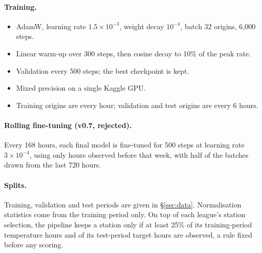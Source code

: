 \paragraph{Training.}
\begin{itemize}
\item AdamW, learning rate $1.5\times10^{-3}$, weight decay $10^{-4}$, batch 32 origins, 6{,}000 steps.
\item Linear warm-up over 300 steps, then cosine decay to 10\% of the peak rate.
\item Validation every 500 steps; the best checkpoint is kept.
\item Mixed precision on a single Kaggle GPU.
\item Training origins are every hour; validation and test origins are every 6 hours.
\end{itemize}

\paragraph{Rolling fine-tuning (v0.7, rejected).}
Every 168 hours, each final model is fine-tuned for 500 steps at learning rate $3\times10^{-4}$, using only hours
observed before that week, with half of the batches drawn from the last 720 hours.

\paragraph{Splits.}
Training, validation and test periods are given in \S\ref{sec:data}. Normalisation statistics come from the
training period only. On top of each league's station selection, the pipeline keeps a station only if at least 25\% of its training-period temperature hours and of its
test-period target hours are observed, a rule fixed before any scoring.
